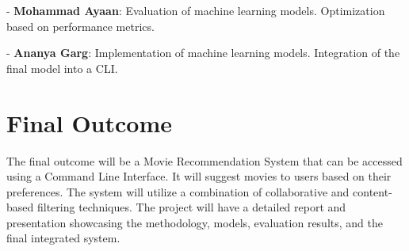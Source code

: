 \documentclass[10pt,twocolumn,letterpaper]{article}
\begin{document}
- \textbf{Mohammad Ayaan}: Evaluation of machine learning models. Optimization based on performance metrics.

- \textbf{Ananya Garg}: Implementation of machine learning models. Integration of the final model into a CLI.

\section{Final Outcome}
The final outcome will be a Movie Recommendation System that can be accessed using a Command Line Interface. It will suggest movies to users based on their preferences. The system will utilize a combination of collaborative and content-based filtering techniques. The project will have a detailed report and presentation showcasing the methodology, models, evaluation results, and the final integrated system.
\end{document}
